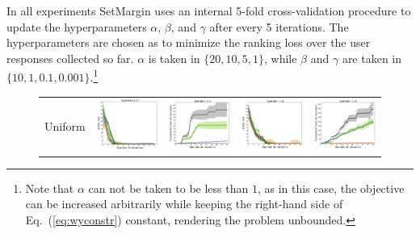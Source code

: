 \documentclass{article}
\renewcommand\[{\begin{equation}}
\renewcommand\]{\end{equation}}
\begin{document}
In all experiments {\sc SetMargin} uses an internal 5-fold cross-validation procedure to
update the hyperparameters $\alpha$, $\beta$, and $\gamma$ after every 5
iterations. The hyperparameters are chosen as to minimize the ranking loss over
the user responses collected so far. $\alpha$ is taken in $\{20, 10, 5, 1\}$,
while $\beta$ and $\gamma$ are taken in $\{10, 1, 0.1, 0.001\}$.\footnote{Note
that $\alpha$ can not be taken to be less than $1$, as in this case, the
objective can be increased arbitrarily while keeping the right-hand side of
Eq.~(\ref{eq:wyconstr}) constant, rendering the problem unbounded.}



\begin{figure}[t]
    \centering
    {\footnotesize
    \begin{tabular}{ccccc}
        \\
        {\sc Uniform}  &
        \includegraphics[align=c,width=10em]{figures/synthetic_vs_others_3_uniform_per_iter_loss} &
        \includegraphics[align=c,width=10em]{figures/synthetic_vs_others_3_uniform_per_iter_time} &
        \includegraphics[align=c,width=10em]{figures/synthetic_vs_others_4_uniform_per_iter_loss} &
        \includegraphics[align=c,width=10em]{figures/synthetic_vs_others_4_uniform_per_iter_time}

\end{tabular}}
\end{figure}
\end{document}
